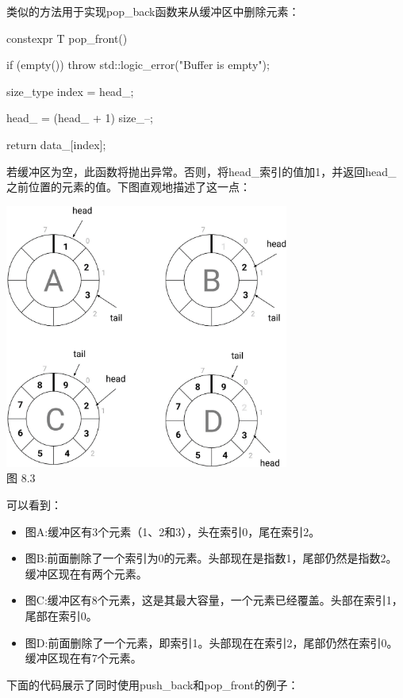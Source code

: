 类似的方法用于实现pop\_back函数来从缓冲区中删除元素：

\begin{cpp}
constexpr T pop_front()
{
	if (empty()) throw std::logic_error("Buffer is empty");
	
	size_type index = head_;
	
	head_ = (head_ + 1) %
	size_--;
	
	return data_[index];
}
\end{cpp}

若缓冲区为空，此函数将抛出异常。否则，将head\_索引的值加1，并返回head\_之前位置的元素的值。下图直观地描述了这一点：

\begin{center}
\includegraphics[width=0.7\textwidth]{images/3.png}\\
图 8.3
\end{center}

可以看到：

\begin{itemize}
\item
图A:缓冲区有3个元素（1、2和3），头在索引0，尾在索引2。

\item
图B:前面删除了一个索引为0的元素。头部现在是指数1，尾部仍然是指数2。缓冲区现在有两个元素。

\item
图C:缓冲区有8个元素，这是其最大容量，一个元素已经覆盖。头部在索引1，尾部在索引0。

\item
图D:前面删除了一个元素，即索引1。头部现在在索引2，尾部仍然在索引0。缓冲区现在有7个元素。
\end{itemize}

下面的代码展示了同时使用push\_back和pop\_front的例子：

